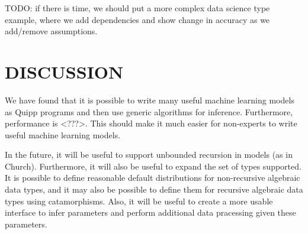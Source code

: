 \documentclass{article}
\begin{document}
TODO: if there is time, we should put a more complex data science type example, where we add dependencies and show change in accuracy as we add/remove assumptions.


  \section{DISCUSSION}

  We have found that it is possible to write many useful machine learning models as Quipp programs and then use generic algorithms for inference.  Furthermore, performance is <???>.  This should make it much easier for non-experts to write useful machine learning models.
  
  In the future, it will be useful to support unbounded recursion in models (as in Church).  Furthermore, it will also be useful to expand the set of types supported.  It is possible to define reasonable default distributions for non-recursive algebraic data types, and it may also be possible to define them for recursive algebraic data types using catamorphisms.  Also, it will be useful to create a more usable interface to infer parameters and perform additional data pracessing given these parameters.
\end{document}
